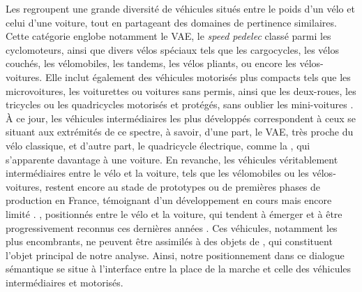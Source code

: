 \begin{refsegment}
{    Les  regroupent une grande diversité de véhicules situés entre le poids d’un vélo et celui d’une voiture, tout en partageant des domaines de pertinence similaires. Cette catégorie englobe notamment le \acrshort{VAE}, le \textsl{speed pedelec} classé parmi les cyclomoteurs, ainsi que divers vélos spéciaux tels que les cargocycles, les vélos couchés, les vélomobiles, les tandems, les vélos pliants, ou encore les vélos-voitures. Elle inclut également des véhicules motorisés plus compacts tels que les microvoitures, les voiturettes ou voitures sans permis, ainsi que les deux-roues, les tricycles ou les quadricycles motorisés et protégés, sans oublier les mini-voitures \textcolor{blue}{\autocites{bigo_malus_2020}{heran_avenir_2022}[2]{bigo_quelle_2024}}.
À ce jour, les véhicules intermédiaires les plus développés correspondent à ceux se situant aux extrémités de ce spectre, à savoir, d’une part, le \acrshort{VAE}, très proche du vélo classique, et d’autre part, le quadricycle électrique, comme la , qui s’apparente davantage à une voiture. En revanche, les véhicules véritablement intermédiaires entre le vélo et la voiture, tels que les vélomobiles ou les vélos-voitures, restent encore au stade de prototypes ou de premières phases de production en France, témoignant d’un développement en cours mais encore limité \textcolor{blue}{\autocite{bigo_vehicules_2023}}.
}, positionnés entre le vélo et la voiture, qui tendent à émerger et à être progressivement reconnus ces dernières années \textcolor{blue}{\autocites{bigo_malus_2020}{heran_avenir_2022}[12]{bigo_quelle_2024}}. Ces véhicules, notamment les plus encombrants, ne peuvent être assimilés à des objets de , qui constituent l’objet principal de notre analyse. Ainsi, notre positionnement dans ce dialogue sémantique se situe à l’interface entre la place de la marche et celle des véhicules intermédiaires et motorisés.%


\end{refsegment}
